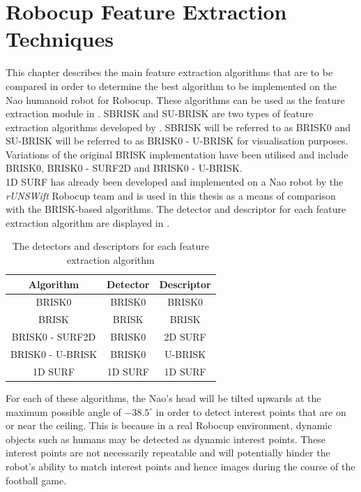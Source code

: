 \chapter{Robocup Feature Extraction Techniques}
\label{sec:realtimeFeatureExtraction}
This chapter describes the main feature extraction algorithms that are to be compared in order to determine the best algorithm to be implemented on the Nao humanoid robot for Robocup. These algorithms can be used as the feature extraction module in . SBRISK and SU-BRISK are two types of feature extraction algorithms developed by \citet{Leutenegger2011}. SBRISK will be referred to as BRISK0 and SU-BRISK will be referred to as BRISK0 - U-BRISK for visualisation purposes. Variations of the original BRISK implementation \citep{Leutenegger2011} have been utilised and include BRISK0, BRISK0 - SURF2D and BRISK0 - U-BRISK.\\

1D SURF has already been developed and implemented on a Nao robot by the \textit{rUNSWift} Robocup team \citep{Anderson} and is used in this thesis as a means of comparison with the BRISK-based algorithms. The detector and descriptor for each feature extraction algorithm are displayed in .\\

\begin{table}
\centering
\caption{The detectors and descriptors for each feature extraction algorithm}
\begin{tabular}{|c|c|c|}
\hline 
Algorithm & Detector & Descriptor\tabularnewline
\hline 
\hline 
BRISK0 & BRISK0 & BRISK0\tabularnewline
\hline 
BRISK & BRISK & BRISK\tabularnewline
\hline 
BRISK0 - SURF2D & BRISK0 & 2D SURF\tabularnewline
\hline 
BRISK0 - U-BRISK & BRISK0 & U-BRISK\tabularnewline
\hline 
1D SURF & 1D SURF & 1D SURF\tabularnewline
\hline 
\end{tabular}
\label{tab:detector_descriptor}
\end{table}


For each of these algorithms, the Nao's head will be tilted upwards at the maximum possible angle of $-38.5^{\circ}$ \citep{NaoHead} in order to detect interest points that are on or near the ceiling. This is because in a real Robocup environment, dynamic objects such as humans may be detected as dynamic interest points. These interest points are not necessarily repeatable and will potentially hinder the robot's  ability to match interest points and hence images during the course of the football game.\\


